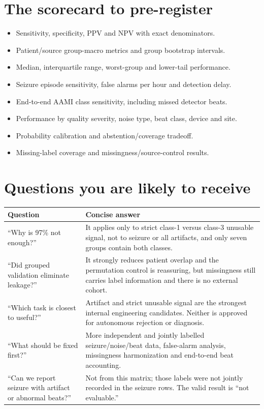 \documentclass[9pt]{extarticle}
\begin{document}
\section*{The scorecard to pre-register}
\begin{multicols}{2}
\begin{itemize}
\item Sensitivity, specificity, PPV and NPV with exact denominators.
\item Patient/source group-macro metrics and group bootstrap intervals.
\item Median, interquartile range, worst-group and lower-tail performance.
\item Seizure episode sensitivity, false alarms per hour and detection delay.
\item End-to-end AAMI class sensitivity, including missed detector beats.
\item Performance by quality severity, noise type, beat class, device and site.
\item Probability calibration and abstention/coverage tradeoff.
\item Missing-label coverage and missingness/source-control results.
\end{itemize}
\end{multicols}

\section*{Questions you are likely to receive}
\begin{tabularx}{\linewidth}{@{}L{2.0in}Y@{}}
\toprule
Question & Concise answer \tabularnewline
\midrule
``Why is 97\% not enough?'' & It applies only to strict class-1 versus class-3 unusable signal, not to seizure or all artifacts, and only seven groups contain both classes. \tabularnewline
``Did grouped validation eliminate leakage?'' & It strongly reduces patient overlap and the permutation control is reassuring, but missingness still carries label information and there is no external cohort. \tabularnewline
``Which task is closest to useful?'' & Artifact and strict unusable signal are the strongest internal engineering candidates. Neither is approved for autonomous rejection or diagnosis. \tabularnewline
``What should be fixed first?'' & More independent and jointly labelled seizure/noise/beat data, false-alarm analysis, missingness harmonization and end-to-end beat accounting. \tabularnewline
``Can we report seizure with artifact or abnormal beats?'' & Not from this matrix; those labels were not jointly recorded in the seizure rows. The valid result is ``not evaluable.'' \tabularnewline
\bottomrule
\end{tabularx}
\end{document}
